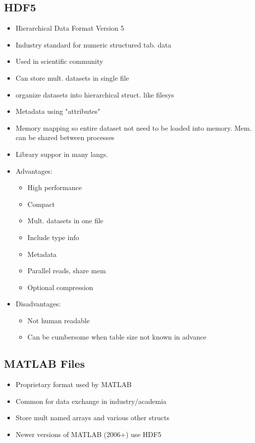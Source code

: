\documentclass[a4paper]{article}
\begin{document}
\subsection{HDF5}
\begin{itemize}
	\item Hierarchical Data Format Version 5
	\item Industry standard for numeric structured tab. data
	\item Used in scientific community
	\item Can store mult. datasets in single file
	\item organize datasets into hierarchical struct. like filesys
	\item Metadata using "attributes"
	\item Memory mapping so entire dataset not need to be loaded into
		memory. Mem. can be shared between processes
	\item Library suppor in many langs.
	\item Advantages:
	\begin{itemize}
		\item High performance
		\item Compact
		\item Mult. datasets in one file
		\item Include type info
		\item Metadata
		\item Parallel reads, share mem
		\item Optional compression
	\end{itemize}
	\item Disadvantages:
	\begin{itemize}
		\item Not human readable
		\item Can be cumbersome when table size not known in advance
	\end{itemize}
\end{itemize}
\subsection{MATLAB Files}
\begin{itemize}
	\item Proprietary format used by MATLAB
	\item Common for data exchange in industry/academia
	\item Store mult named arrays and various other structs
	\item Newer versions of MATLAB (2006+) use HDF5
\end{itemize}
\end{document}
